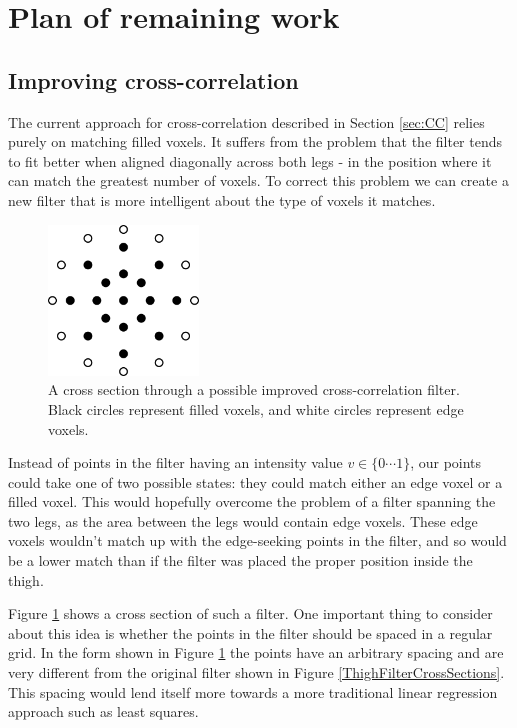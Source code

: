 \section{Plan of remaining work}

\subsection{Improving cross-correlation}\label{ImprovedCC}

The current approach for cross-correlation described in Section \ref{sec:CC} relies purely on matching filled voxels.
It suffers from the problem that the filter tends to fit better when aligned diagonally across both legs - in the position where it can match the greatest number of voxels.
To correct this problem we can create a new filter that is more intelligent about the type of voxels it matches.

\begin{figure}[b]
	\centering
	\includegraphics[width=4cm]{improvedfilter.png}
	\caption{A cross section through a possible improved cross-correlation filter.
		Black circles represent filled voxels, and white circles represent edge voxels.}
	\label{ImprovedFilter}
\end{figure}

Instead of points in the filter having an intensity value $v \in \{0 \cdots 1\}$, our points could take one of two possible states: they could match either an edge voxel or a filled voxel.
This would hopefully overcome the problem of a filter spanning the two legs, as the area between the legs would contain edge voxels.
These edge voxels wouldn't match up with the edge-seeking points in the filter, and so would be a lower match than if the filter was placed the proper position inside the thigh.

Figure \ref{ImprovedFilter} shows a cross section of such a filter.
One important thing to consider about this idea is whether the points in the filter should be spaced in a regular grid.
In the form shown in Figure \ref{ImprovedFilter} the points have an arbitrary spacing and are very different from the original filter shown in Figure \ref{ThighFilterCrossSections}.
This spacing would lend itself more towards a more traditional linear regression approach such as least squares.
